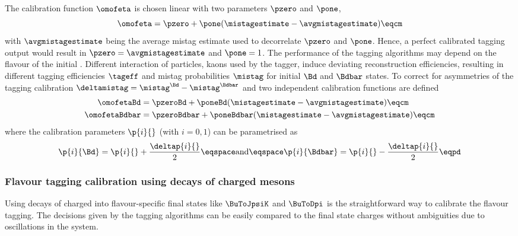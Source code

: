 The calibration function $\omofeta$ is chosen linear with two parameters
$\pzero$ and $\pone$,
%
\begin{equation}\label{eq:flavour_tagging:calibration:method:calibration}
  \omofeta = \pzero + \pone (\mistagestimate - \avgmistagestimate)\eqcm
\end{equation}
%
with $\avgmistagestimate$ being the average mistag estimate used to decorrelate
$\pzero$ and $\pone$. Hence, a perfect calibrated tagging output would result in
$\pzero = \avgmistagestimate$ and $\pone = 1$. The performance of the tagging
algorithms may depend on the flavour of the initial \Bmeson. Different
interaction of particles, \eg kaons used by the \OSK tagger, induce deviating
reconstruction efficiencies, resulting in different tagging efficiencies
$\tageff$ and mistag probabilities $\mistag$ for initial $\Bd$ and $\Bdbar$
states. To correct for asymmetries of the tagging calibration $\deltamistag =
\mistag^{\Bd} - \mistag^{\Bdbar}$ and two independent calibration functions are
defined
%
\begin{equation}\label{eq:flavour_tagging:calibration:method:asymmetric_calibration:omega}
  \begin{split}
    \omofetaBd    &= \pzeroBd    + \poneBd    (\mistagestimate - \avgmistagestimate)\eqcm \\
    \omofetaBdbar &= \pzeroBdbar + \poneBdbar (\mistagestimate - \avgmistagestimate)\eqcm
  \end{split}
\end{equation}
%
where the calibration parameters $\p{i}{}$ (with $i=0,1$) can be parametrised as
%
\begin{equation}\label{eq:flavour_tagging:calibration:method:asymmetric_calibration:ps}
  \p{i}{\Bd} = \p{i}{} + \frac{\deltap{i}{}}{2} \eqspace\text{and}\eqspace \p{i}{\Bdbar} = \p{i}{} - \frac{\deltap{i}{}}{2}\eqpd
\end{equation}

\subsubsection[Flavour tagging calibration using decays of charged \Bmesons]{Flavour tagging calibration using decays of charged \Bbfsf mesons}
\label{sec:flavour_tagging:calibration:method:charged}

Using decays of charged \Bmesons into flavour-specific final states like
$\BuToJpsiK$ and $\BuToDpi$ is the straightforward way to calibrate the flavour
tagging. The decisions given by the tagging algorithms can be easily compared to
the final state charges without ambiguities due to oscillations in the \Bmeson
system.

